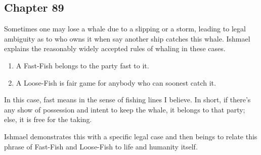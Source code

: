 \subsection{Chapter 89}

Sometimes one may lose a whale due to a slipping or a storm, leading to legal
ambiguity as to who owns it when say another ship catches this whale. Ishmael
explains the reasonably widely accepted rules of whaling in these cases.
\begin{enumerate}
    \item A Fast-Fish belongs to the party fast to it.
    \item A Loose-Fish is fair game for anybody who can soonest catch it.
\end{enumerate}
In this case, fast means in the sense of fishing lines I believe. In short, if
there's any show of possession and intent to keep the whale, it belongs to that
party; else, it is free for the taking.

Ishmael demonstrates this with a specific legal case and then beings to relate
this phrase of Fast-Fish and Loose-Fish to life and humanity itself.
